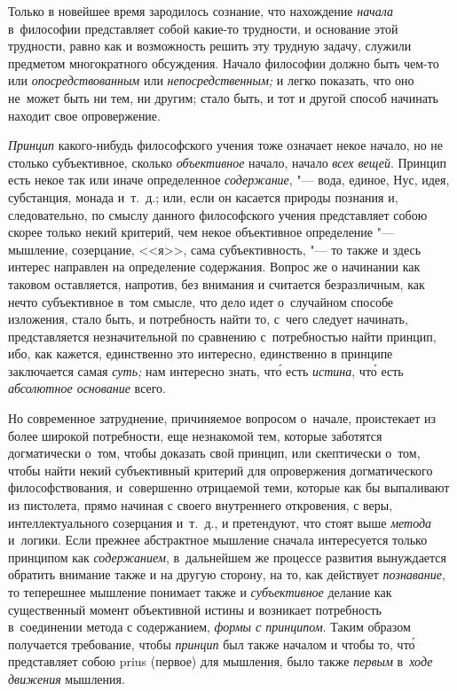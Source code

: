 Только в новейшее время зародилось сознание, что нахождение {\em начала}
в~философии представляет собой какие-то трудности, и основание этой трудности,
равно как и возможность решить эту трудную задачу, служили предметом
многократного обсуждения. Начало философии должно быть чем-то или {\em
опосредствованным} или {\em непосредственным;} и легко показать, что оно
не~может быть ни тем, ни другим; стало быть, и тот и другой способ начинать
находит свое опровержение.

{\em Принцип} какого-нибудь философского учения тоже означает некое начало, но
не столько субъективное, сколько {\em объективное} начало, начало
{\em всех вещей}. Принцип есть некое так или иначе определенное
{\em содержание}, "--- вода, единое, Нус, идея, субстанция,
монада и~т.~д.; или, если он касается природы познания и, следовательно, по
смыслу данного философского учения представляет собою скорее только некий
критерий, чем некое объективное определение "--- мышление, созерцание, <<я>>,
сама субъективность, "--- то также и здесь интерес направлен на определение
содержания. Вопрос же о начинании как таковом оставляется, напротив, без
внимания и считается безразличным, как нечто субъективное в~том смысле, что
дело идет о~случайном способе изложения, стало быть, и потребность найти то,
с~чего следует начинать, представляется незначительной по сравнению
с~потребностью найти принцип, ибо, как кажется, единственно это интересно,
единственно в принципе заключается самая {\em суть;} нам интересно знать,
чт\'{о} есть {\em истина}, чт\'{о} есть {\em абсолютное основание} всего.

Но современное затруднение, причиняемое вопросом о~начале, проистекает из более
широкой потребности, еще незнакомой тем, которые заботятся догматически о~том,
чтобы доказать свой принцип, или скептически о~том, чтобы найти некий
субъективный критерий для опровержения догматического философствования,
и~совершенно отрицаемой теми, которые как бы выпаливают из пистолета, прямо
начиная с своего внутреннего откровения, с веры, интеллектуального созерцания
и~т.~д., и претендуют, что стоят выше {\em метода} и~логики. Если прежнее
абстрактное мышление сначала интересуется только принципом как
{\em содержанием}, в~дальнейшем же процессе развития вынуждается обратить
внимание также и на другую сторону, на то, как действует {\em познавание},
то теперешнее мышление понимает также и {\em субъективное} делание как
существенный момент объективной истины и возникает потребность в~соединении
метода с содержанием, {\em формы с принципом}. Таким образом получается
требование, чтобы {\em принцип} был также началом и чтобы то, чт\'{о}
представляет собою prius (первое) для мышления, было также {\em первым}
в~{\em ходе движения} мышления.

